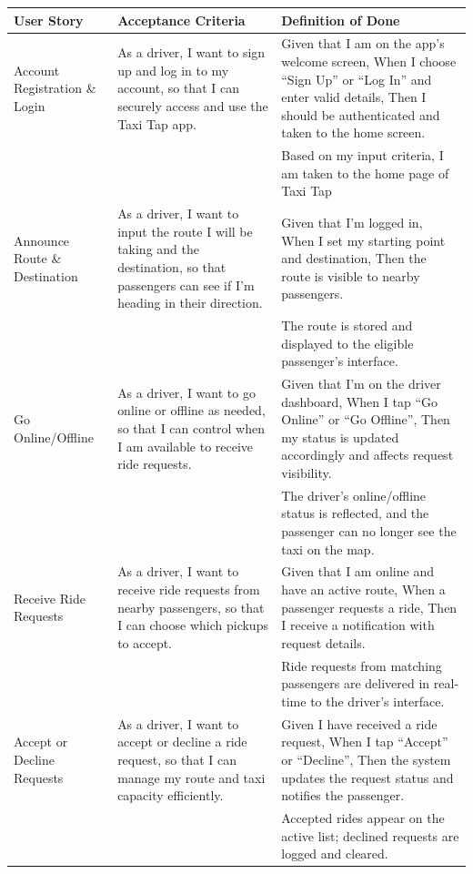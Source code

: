 \documentclass[a4paper,12pt]{article}
\begin{document}
\begin{longtable}{>{\raggedright}p{4cm} p{6cm} p{5cm}}
\toprule
\textbf{User Story} & \textbf{Acceptance Criteria} & \textbf{Definition of Done} \\
\midrule
Account Registration \& Login & As a driver, I want to sign up and log in to my account, so that I can securely access and use the Taxi Tap app. & Given that I am on the app’s welcome screen, When I choose “Sign Up” or “Log In” and enter valid details, Then I should be authenticated and taken to the home screen. \\
& & Based on my input criteria, I am taken to the home page of Taxi Tap \\ \midrule
Announce Route \& Destination & As a driver, I want to input the route I will be taking and the destination, so that passengers can see if I’m heading in their direction. & Given that I’m logged in, When I set my starting point and destination, Then the route is visible to nearby passengers. \\
& & The route is stored and displayed to the eligible passenger's interface. \\ \midrule
Go Online/Offline & As a driver, I want to go online or offline as needed, so that I can control when I am available to receive ride requests. & Given that I’m on the driver dashboard, When I tap “Go Online” or “Go Offline”, Then my status is updated accordingly and affects request visibility. \\
& & The driver's online/offline status is reflected, and the passenger can no longer see the taxi on the map. \\ \midrule
Receive Ride Requests & As a driver, I want to receive ride requests from nearby passengers, so that I can choose which pickups to accept. & Given that I am online and have an active route, When a passenger requests a ride, Then I receive a notification with request details. \\
& & Ride requests from matching passengers are delivered in real-time to the driver’s interface. \\ \midrule
Accept or Decline Requests & As a driver, I want to accept or decline a ride request, so that I can manage my route and taxi capacity efficiently. & Given I have received a ride request, When I tap “Accept” or “Decline”, Then the system updates the request status and notifies the passenger. \\
& & Accepted rides appear on the active list; declined requests are logged and cleared. \\ \midrule

\end{longtable}
\end{document}
